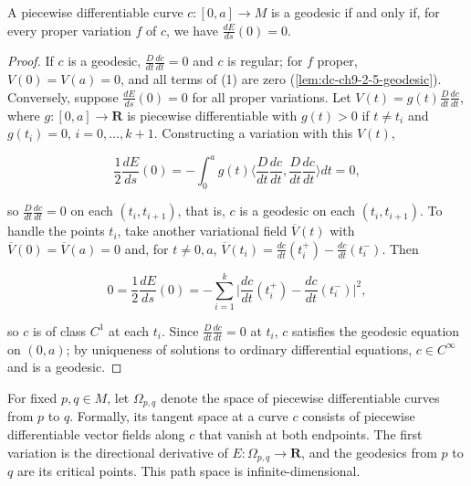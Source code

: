 \begin{proposition}
  \label{prop:dc-ch9-2-5}
  A piecewise differentiable curve $c:[0,a]\to M$ is a geodesic if and only if, for
  every proper variation $f$ of $c$, we have $\frac{dE}{ds}(0)=0$.
\end{proposition}
\begin{proof}
  \sketch
  If $c$ is a geodesic, $\frac{D}{dt}\frac{dc}{dt}=0$ and $c$ is regular;
  for $f$ proper, $V(0)=V(a)=0$, and all terms of (1) are zero
  (\cref{lem:dc-ch9-2-5-geodesic}). Conversely, suppose
  $\frac{dE}{ds}(0)=0$ for all proper variations. Let
  $V(t)=g(t)\frac{D}{dt}\frac{dc}{dt}$, where $g:[0,a]\to\mathbf{R}$ is piecewise
  differentiable with $g(t)>0$ if $t\ne t_i$ and $g(t_i)=0$, $i=0,\dots,k+1$.
  Constructing a variation
  with this $V(t)$,

  $$
  \frac{1}{2}\frac{dE}{ds}(0)=-\int_0^a g(t)\Big\langle\frac{D}{dt}\frac{dc}{dt},\frac{D}{dt}\frac{dc}{dt}\Big\rangle dt=0,
  $$

  so $\frac{D}{dt}\frac{dc}{dt}=0$ on each $(t_i,t_{i+1})$, that is, $c$ is a geodesic
  on each $(t_i,t_{i+1})$. To handle the points $t_i$, take another variational field
  $\overline V(t)$ with $\overline V(0)=\overline V(a)=0$ and, for $t\ne 0,a$,
  $\overline V(t_i)=\frac{dc}{dt}(t_i^+)-\frac{dc}{dt}(t_i^-)$. Then

  $$
  0=\frac{1}{2}\frac{dE}{ds}(0)=-\sum_{i=1}^k\Big|\frac{dc}{dt}(t_i^+)-\frac{dc}{dt}(t_i^-)\Big|^2,
  $$

  so $c$ is of class $C^1$ at each $t_i$. Since $\frac{D}{dt}\frac{dc}{dt}=0$ at
  $t_i$, $c$ satisfies the geodesic equation on $(0,a)$; by uniqueness of solutions
  to ordinary differential equations, $c\in C^\infty$ and is a geodesic.
\end{proof}
\begin{remark}
  \label{rem:dc-ch9-2-7}
  For fixed $p,q\in M$, let $\Omega_{p,q}$ denote the space of piecewise
  differentiable curves from $p$ to $q$. Formally, its tangent space at a curve
  $c$ consists of piecewise differentiable vector fields along $c$ that vanish
  at both endpoints. The first variation is the directional derivative of
  $E:\Omega_{p,q}\to\mathbf{R}$, and the geodesics from $p$ to $q$ are its
  critical points. This path space is infinite-dimensional.
\end{remark}
